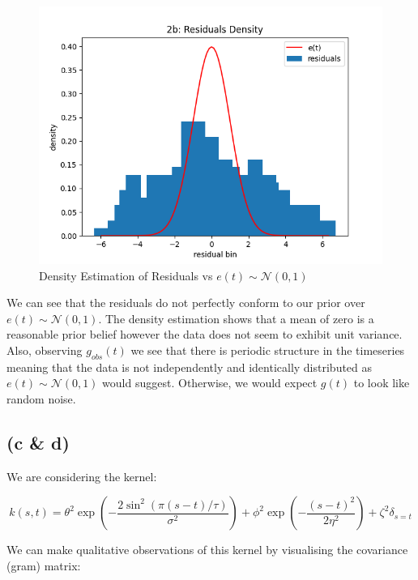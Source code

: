 \documentclass[12pt]{article}
\begin{document}
\begin{figure}[h]
\centering
\includegraphics[scale=0.5]{outputs/q2/b-residuals-density-estimation}
\caption{Density Estimation of Residuals vs $e(t) \sim \mathcal{N}(0, 1)$}
\label{fig:b-residuals-density-estimation}
\end{figure}

We can see that the residuals do not perfectly conform to our prior over $e(t) \sim \mathcal{N}(0, 1)$.
The density estimation shows that a mean of zero is a reasonable prior belief however the data does not seem to exhibit unit variance.
Also, observing $g_{obs}(t)$ we see that there is periodic structure in the timeseries meaning that the data is not independently and identically distributed as $e(t) \sim \mathcal{N}(0, 1)$ would suggest.
Otherwise, we would expect $g(t)$ to look like random noise.

\newpage
\subsection*{(c \& d)}

We are considering the kernel:

\[k(s, t) = \theta^2 \exp\left( - \frac{2\sin^2(\pi(s-t)/\tau)}{\sigma^2}\right) + \phi^2 \exp\left( - \frac{(s-t)^2}{2\eta^2}\right) + \zeta^2 \delta_{s=t}\]

We can make qualitative observations of this kernel by visualising the covariance (gram) matrix:
\end{document}
